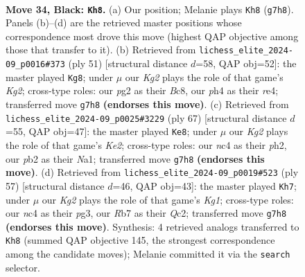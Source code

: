 \documentclass[11pt]{article}
\begin{document}
\clearpage

\begin{figure}[p]\centering
\begin{subfigure}{0.46\textwidth}\centering
\resizebox{\linewidth}{!}{%
\newchessgame
\chessboard[
  setfen={5r2/1r4kp/1p6/p7/2N3QP/8/PP3PP1/R5K1 b - - 6 34},
  showmover=false,
  pgfstyle=straightmove, color=movearrow, markmove={g7-h8}
]}
\caption{}
\end{subfigure}\hfill
\begin{subfigure}{0.46\textwidth}\centering
\resizebox{\linewidth}{!}{%
\newchessgame
\chessboard[
  setfen={2b2r2/pr4k1/1p6/4Q3/4R3/P7/1P3P1P/6K1 b - - 0 26},
  showmover=false,
  pgfstyle=straightmove, color=movearrow, markmove={g7-g8}
]}
\caption{}
\end{subfigure}
\\[4pt]
\begin{subfigure}{0.46\textwidth}\centering
\resizebox{\linewidth}{!}{%
\newchessgame
\chessboard[
  setfen={3r4/4k1p1/4r2p/1PQ5/p7/4P3/6PP/n5K1 b - - 2 34},
  showmover=false,
  pgfstyle=straightmove, color=movearrow, markmove={e7-e8}
]}
\caption{}
\end{subfigure}\hfill
\begin{subfigure}{0.46\textwidth}\centering
\resizebox{\linewidth}{!}{%
\newchessgame
\chessboard[
  setfen={1Q4k1/p5p1/7p/P7/8/6P1/1Pqr1P1P/R5K1 b - - 2 29},
  showmover=false,
  pgfstyle=straightmove, color=movearrow, markmove={g8-h7}
]}
\caption{}
\end{subfigure}
\caption{\textbf{Move 34, Black: \texttt{Kh8}.} (a) Our position; Melanie plays \texttt{Kh8} (\texttt{g7h8}). Panels (b)--(d) are the retrieved master positions whose correspondence most drove this move (highest QAP objective among those that transfer to it). (b) Retrieved from \texttt{lichess\_elite\_2024-09\_p0016\#373} (ply 51) [structural distance $d$=58, QAP obj=52]: the master played \texttt{Kg8}; under $\mu$ our \emph{Kg2} plays the role of that game's \emph{Kg2}; cross-type roles: our \emph{p}g2 as their \emph{B}c8, our \emph{p}h4 as their \emph{r}e4; transferred move \texttt{g7h8} \textbf{(endorses this move)}. (c) Retrieved from \texttt{lichess\_elite\_2024-09\_p0025\#3229} (ply 67) [structural distance $d$=55, QAP obj=47]: the master played \texttt{Ke8}; under $\mu$ our \emph{Kg2} plays the role of that game's \emph{Ke2}; cross-type roles: our \emph{n}c4 as their \emph{p}h2, our \emph{p}b2 as their \emph{N}a1; transferred move \texttt{g7h8} \textbf{(endorses this move)}. (d) Retrieved from \texttt{lichess\_elite\_2024-09\_p0019\#523} (ply 57) [structural distance $d$=46, QAP obj=43]: the master played \texttt{Kh7}; under $\mu$ our \emph{Kg2} plays the role of that game's \emph{Kg1}; cross-type roles: our \emph{n}c4 as their \emph{p}g3, our \emph{R}b7 as their \emph{Q}c2; transferred move \texttt{g7h8} \textbf{(endorses this move)}. Synthesis: 4 retrieved analogs transferred to \texttt{Kh8} (summed QAP objective 145, the strongest correspondence among the candidate moves); Melanie committed it via the \texttt{search} selector.}
\label{fig:thought-m67}
\end{figure}
\end{document}
